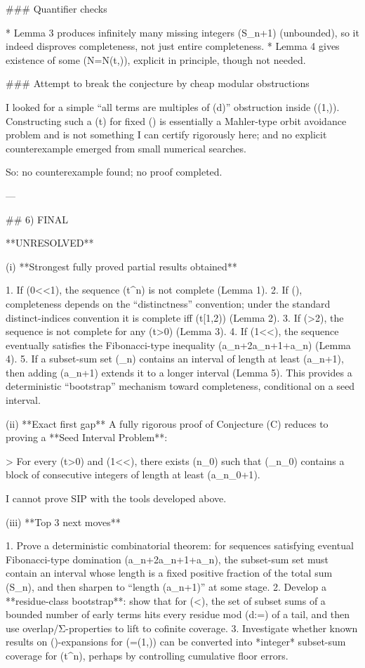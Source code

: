 ### Quantifier checks

* Lemma 3 produces infinitely many missing integers (S_n+1) (unbounded), so it indeed disproves completeness, not just entire completeness.
* Lemma 4 gives existence of some (N=N(t,\alpha)), explicit in principle, though not needed.

### Attempt to break the conjecture by cheap modular obstructions

I looked for a simple “all terms are multiples of (d)” obstruction inside (\alpha\in(1,\varphi)). Constructing such a (t) for fixed (\alpha) is essentially a Mahler-type orbit avoidance problem and is not something I can certify rigorously here; and no explicit counterexample emerged from small numerical searches.

So: no counterexample found; no proof completed.

---

## 6) FINAL

**UNRESOLVED**

(i) **Strongest fully proved partial results obtained**

1. If (0<\alpha<1), the sequence (\lfloor t\alpha^n\rfloor) is not complete (Lemma 1).
2. If (), completeness depends on the “distinctness” convention; under the standard distinct-indices convention it is complete iff (t\in[1,2)) (Lemma 2).
3. If (\alpha>2), the sequence is not complete for any (t>0) (Lemma 3).
4. If (1<\alpha<\varphi), the sequence eventually satisfies the Fibonacci-type inequality (a_{n+2}\le a_{n+1}+a_n) (Lemma 4).
5. If a subset-sum set (\Sigma_n) contains an interval of length at least (a_{n+1}), then adding (a_{n+1}) extends it to a longer interval (Lemma 5). This provides a deterministic “bootstrap” mechanism toward completeness, conditional on a seed interval.

(ii) **Exact first gap**
A fully rigorous proof of Conjecture (C) reduces to proving a **Seed Interval Problem**:

> For every (t>0) and (1<\alpha<\varphi), there exists (n_0) such that (\Sigma_{n_0}) contains a block of consecutive integers of length at least (a_{n_0+1}).

I cannot prove SIP with the tools developed above.

(iii) **Top 3 next moves**

1. Prove a deterministic combinatorial theorem: for sequences satisfying eventual Fibonacci-type domination (a_{n+2}\le a_{n+1}+a_n), the subset-sum set must contain an interval whose length is a fixed positive fraction of the total sum (S_n), and then sharpen to “length (\ge a_{n+1})” at some stage.
2. Develop a **residue-class bootstrap**: show that for (\alpha<\varphi), the set of subset sums of a bounded number of early terms hits every residue mod (d:=\gcd) of a tail, and then use overlap/Σ-properties to lift to cofinite coverage.
3. Investigate whether known results on (\beta)-expansions for (\beta=\alpha\in(1,\varphi)) can be converted into *integer* subset-sum coverage for (\lfloor t\alpha^n\rfloor), perhaps by controlling cumulative floor errors.

